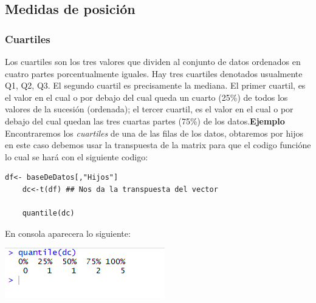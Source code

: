 \documentclass[12pt,hidelinks]{article}
\begin{document}
	\subsection{Medidas de posición}
	\subsubsection{Cuartiles}
	Los cuartiles son los tres valores que dividen al conjunto de datos ordenados en cuatro partes porcentualmente iguales.
	Hay tres cuartiles denotados usualmente Q1, Q2, Q3. El segundo cuartil es precisamente la mediana. El primer cuartil, es el valor en el cual o por debajo del cual queda un cuarto (25\%) de todos los valores de la sucesión (ordenada); el tercer cuartil, es el valor en el cual o por debajo del cual quedan las tres cuartas partes (75\%) de los datos.\textbf{Ejemplo}\\
	\vspace{2mm}
	Encontraremos los \textit{cuartiles} de una de las filas de los datos, obtaremos por hijos  en este caso debemos usar la transpuesta de la matrix para que el codigo funcióne lo cual se hará con el siguiente codigo:
	\begin{lstlisting}[frame=single]
	df<- baseDeDatos[,"Hijos"]
	dc<-t(df) ## Nos da la transpuesta del vector
	
	quantile(dc)
	\end{lstlisting}
	En consola aparecera lo siguiente:
	\begin{center}
		\includegraphics[]{Cuartiles.PNG}
	\end{center}
\end{document}
